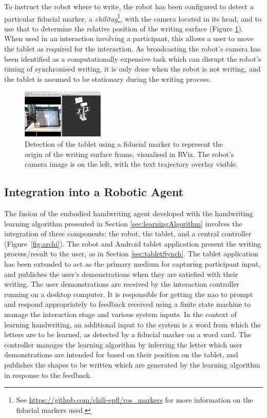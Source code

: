 \documentclass{sig-alternate}
\begin{document}
To instruct the robot where to write, the robot has been configured to detect a
particular fiducial marker, a \emph{chilitag}\footnote{See
\url{https://github.com/chili-epfl/ros_markers} for more information on the
fiducial markers used.}, with the camera located in its head, and to use that to
determine the relative position of the writing surface (Figure
\ref{fig:tabletDetection}). When used in an interaction involving a participant, this
allows a user to move the tablet as required for the interaction. As broadcasting
the robot's camera has been identified as a computationally expensive task which
can disrupt the robot's timing of synchronised writing, it is only done when the
robot is not writing, and the tablet is assumed to be stationary during the
writing process.

\begin{figure}[htpb]
    \centering
    \includegraphics[width=0.35\textwidth]{figures/chilitagDetection_cameraOverlay.png}
    \caption{\label{fig:tabletDetection}Detection of the tablet using a fiducial
    marker to represent the origin of the writing surface frame, visualised in RViz. The robot's
    camera image is on the left, with the text trajectory overlay visible.}

\end{figure}


\subsection{Integration into a Robotic Agent}

The fusion of the embodied handwriting agent developed with the handwriting
learning algorithm presented in Section \ref{sec:learningAlgorithm} involves the
integration of three components: the robot, the tablet, and a central controller
(Figure~\ref{fig:archi}).  The robot and Android tablet application present the
writing process/result to the user, as in Section \ref{sec:tabletSynch}.
The tablet application has been extended to act as the primary medium for
capturing participant input, and publishes the user's demonstrations when they are
satisfied with their writing. The user demonstrations are received by the
interaction controller running on a desktop computer. It is responsible for
getting the {\sc nao} to prompt and respond appropriately to feedback received using
a finite state machine to manage the interaction stage and various system
inputs.  In the context of learning handwriting, an additional input to the system is a word 
from which the letters are to be learned, as detected by a fiducial marker on a word card.
The controller manages the learning algorithm by inferring the letter which
user demonstrations are intended for based on their position on the tablet, and
publishes the shapes to be written which are generated by the learning algorithm
in response to the feedback.  
\end{document}
